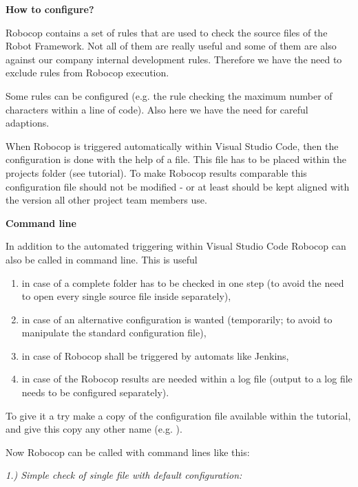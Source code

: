 \vspace{2ex}

\textbf{How to configure?}

Robocop contains a set of rules that are used to check the source files of the Robot Framework. Not all of them are really useful and some of them are also against
our company internal development rules. Therefore we have the need to exclude rules from Robocop execution.

Some rules can be configured (e.g. the rule checking the maximum number of characters within a line of code). Also here we have the need for careful adaptions.

When Robocop is triggered automatically within Visual Studio Code, then the configuration is done with the help of a  file. This file has to be placed 
within the projects folder (see tutorial). To make Robocop results comparable this configuration file should not be modified - or at least should be kept aligned with
the version all other project team members use.

\newpage

\textbf{Command line}

In addition to the automated triggering within Visual Studio Code Robocop can also be called in command line. This is useful
\begin{enumerate}
   \item in case of a complete folder has to be checked in one step (to avoid the need to open every single source file inside separately),
   \item in case of an alternative configuration is wanted (temporarily; to avoid to manipulate the standard configuration file),
   \item in case of Robocop shall be triggered by automats like Jenkins,
   \item in case of the Robocop results are needed within a log file (output to a log file needs to be configured separately).
\end{enumerate}

To give it a try make a copy of the configuration file  available within the tutorial, and give this copy any other name (e.g. ).

Now Robocop can be called with command lines like this:

\vspace{2ex}

\textit{1.) Simple check of single file with default configuration:}

